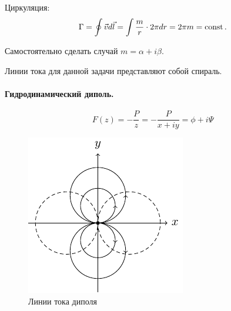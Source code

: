 Циркуляция:
\begin{equation}
	\Gamma=\oint \vec{v}d\vec{l}=\int \frac{m}{r}\cdot 2\pi dr=2\pi m = \mathrm{const}\,.
\end{equation}

Самостоятельно сделать случай $m=\alpha+i\beta$.

%
%
%

Линии тока для данной задачи представляют собой спираль.
\paragraph{Гидродинамический диполь.}
\begin{equation}
	F(z)=-\frac{P}{z}=-\frac{P}{x+iy}=\phi+i\Psi
\end{equation}

\begin{figure}[h!]
    \centering
    \includegraphics[scale=1.5]{img/dipol}
    \caption{Линии тока диполя}
    \label{fig:figure1}
\end{figure}


